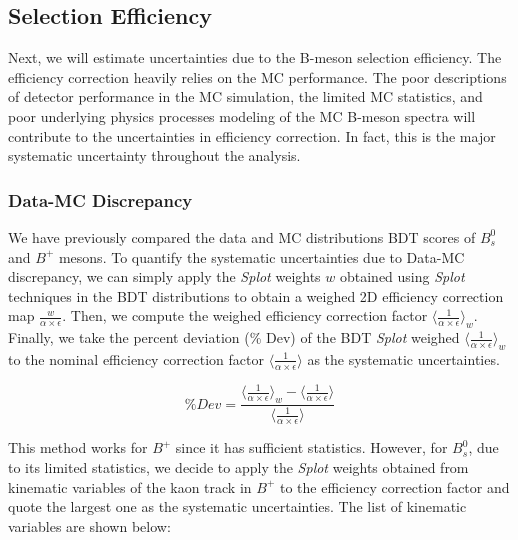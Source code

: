 \subsection{Selection Efficiency}

Next, we will estimate uncertainties due to the B-meson selection efficiency. The efficiency correction heavily relies on the MC performance. The poor descriptions of detector performance in the MC simulation, the limited MC statistics, and poor underlying physics processes modeling of the MC B-meson spectra will contribute to the uncertainties in efficiency correction. In fact, this is the major systematic uncertainty throughout the analysis.

\subsubsection{Data-MC Discrepancy}

We have previously compared the data and MC distributions BDT scores of $B^0_s$ and $B^+$ mesons. To quantify the systematic uncertainties due to Data-MC discrepancy, we can simply apply the \textit{Splot} weights $w$ obtained using \textit{Splot} techniques in the BDT distributions to obtain a weighed 2D efficiency correction map $\frac{w}{\alpha \times \epsilon}$. Then, we compute the weighed efficiency correction factor $\langle \frac{1}{\alpha \times \epsilon}\rangle_{w}$. Finally, we take the percent deviation (\% Dev) of the BDT \textit{Splot} weighed $\langle \frac{1}{\alpha \times \epsilon}\rangle_{w}$ to the nominal efficiency correction factor $\langle \frac{1}{\alpha \times \epsilon}\rangle$ as the systematic uncertainties. 

\begin{equation}
\% Dev = \frac{\langle \frac{1}{\alpha \times \epsilon} \rangle_{w} - \langle \frac{1}{\alpha \times \epsilon} \rangle}{\langle \frac{1}{\alpha \times \epsilon} \rangle}
\end{equation}

This method works for $B^+$ since it has sufficient statistics.  However, for $B^0_s$, due to its limited statistics, we decide to apply the \textit{Splot} weights obtained from kinematic variables of the kaon track in $B^+$ to the efficiency correction factor and quote the largest one as the systematic uncertainties. The list of kinematic variables are shown below: 


